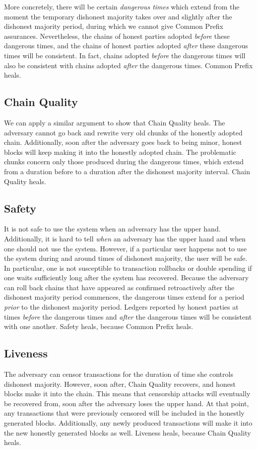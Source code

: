 More concretely, there will be certain \emph{dangerous times} which extend from the moment
the temporary dishonest majority takes over and slightly after the dishonest majority period,
during which we cannot give Common Prefix assurances. Nevertheless, the chains of honest parties
adopted \emph{before} these dangerous times, and the chains of honest parties adopted
\emph{after} these dangerous times will be consistent. In fact, chains adopted \emph{before}
the dangerous times will also be consistent with chains adopted \emph{after} the dangerous
times. Common Prefix heals.

\subsection*{Chain Quality}
We can apply a similar argument to show that Chain Quality heals. The adversary cannot
go back and rewrite very old chunks of the honestly adopted chain. Additionally, soon after
the adversary goes back to being minor, honest blocks will keep making it into the honestly
adopted chain. The problematic chunks concern only those produced during the dangerous
times, which extend from a duration before to a duration after the dishonest majority
interval. Chain Quality heals.

\subsection*{Safety}
It is not safe to use the system when an adversary has the upper hand. Additionally, it is
hard to tell \emph{when} an adversary has the upper hand and when one should not use the system.
However, if a particular user happens not to use the system during and around times of
dishonest majority, the user will be safe. In particular, one is not susceptible to
transaction rollbacks or double spending if one waits sufficiently long after the system
has recovered. Because the adversary can roll back chains that have appeared as confirmed
retroactively after the dishonest majority period commences, the dangerous times extend
for a period \emph{prior} to the dishonest majority period.
Ledgers reported by honest parties at times \emph{before}
the dangerous times and \emph{after} the dangerous times will be consistent with one another.
Safety heals, because Common Prefix heals.

\subsection*{Liveness}
The adversary can censor transactions for the duration of time she controls dishonest majority.
However, soon after, Chain Quality recovers, and honest blocks make it into the chain. This means
that censorship attacks will eventually be recovered from, soon after the adversary loses the upper
hand. At that point, any transactions that were previously censored will be included in the honestly
generated blocks. Additionally, any newly produced transactions will make it into the new honestly
generated blocks as well. Liveness heals, because Chain Quality heals.


